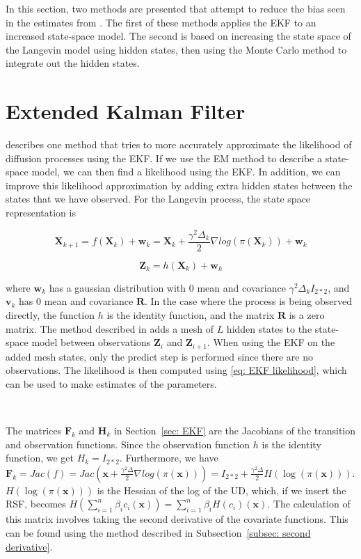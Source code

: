
\label{chap: methods}
In this section, two methods are presented that attempt to reduce the bias seen in the estimates from \cite{michelot_langevin_2019}. The first of these methods applies the EKF to an increased state-space model. The second is based on increasing the state space of the Langevin model using hidden states, then using the Monte Carlo method to integrate out the hidden states. 

\section{Extended Kalman Filter}
\parencite{kulikov_extended_2024} describes one method that tries to more accurately approximate the likelihood of diffusion processes using the EKF. If we use the EM method to describe a state-space model, we can then find a likelihood using the EKF. In addition, we can improve this likelihood approximation by adding extra hidden states between the states that we have observed. For the Langevin process, the state space representation is 

$$\textbf{X}_{k+1} = f(\textbf{X}_k) + \textbf{w}_k = \textbf{X}_k + \frac{\gamma^2\Delta_k}{2}\nabla log(\pi(\textbf{X}_k)) + \textbf{w}_k$$

$$\textbf{Z}_k = h(\textbf{X}_k) + \textbf{w}_k$$

where $\textbf{w}_k$ has a gaussian distribution with $0$ mean and covariance $\gamma^2\Delta_k I_{2*2}$, and $\textbf{v}_k$ has $0$ mean and covariance $\textbf{R}$. In the case where the process is being observed directly, the function $h$ is the identity function, and the matrix $\textbf{R}$ is a zero matrix. The method described in \parencite{kulikov_extended_2024} adds a mesh of $L$ hidden states to the state-space model between observations $\textbf{Z}_i$ and $\textbf{Z}_{i+1}$. When using the EKF on the added mesh states, only the predict step is performed since there are no observations. The likelihood is then computed using \eqref{eq: EKF likelihood}, which can be used to make estimates of the parameters. 

\

The matrices $\textbf{F}_k$ and $\textbf{H}_k$ in Section~\ref{sec: EKF} are the Jacobians of the transition and observation functions. Since the observation function $h$ is the identity function, we get $H_k = I_{2*2}$. Furthermore, we have $\textbf{F}_k = Jac(f) = Jac(\textbf{x} + \frac{\gamma^2 \Delta}{2}\nabla log(\pi(\textbf{x}))) = I_{2*2} + \frac{\gamma^2 \Delta}{2} H(\log(\pi(\textbf{x})))$. $H(\log(\pi(\textbf{x})))$ is the Hessian of the log of the UD, which, if we insert the RSF, becomes $H(\sum_{i=1}^n \beta_i c_i(\textbf{x})) = \sum_{i=1}^n \beta_iH( c_i)(\textbf{x})$. The calculation of this matrix involves taking the second derivative of the covariate functions. This can be found using the method described in Subsection~\ref{subsec: second derivative}.


